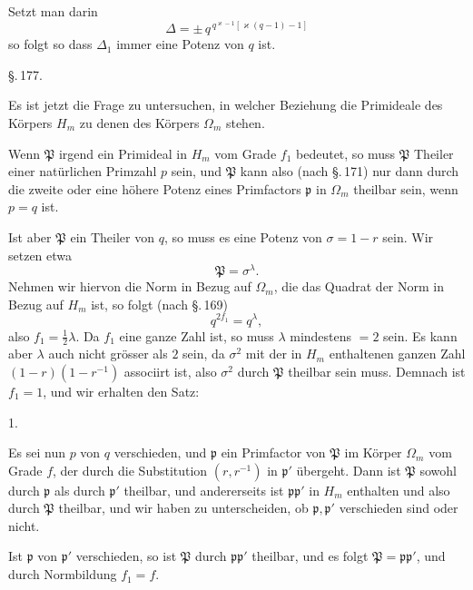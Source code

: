 Setzt man darin
\[
\Delta = \pm\,q^{\,q^{\varkappa-1}[\varkappa(q-1)-1]}
\]
so folgt
so dass $\Delta_1$ immer eine Potenz von $q$ ist.

\begin{center}
\S.\,177.\\[4pt]
\end{center}

Es ist jetzt die Frage zu untersuchen, in welcher Beziehung die Primideale des K\"orpers $H_m$ zu denen des K\"orpers $\Omega_m$ stehen.

Wenn $\mathfrak{P}$ irgend ein Primideal in $H_m$ vom Grade $f_1$ bedeutet, so muss $\mathfrak{P}$ Theiler einer nat\"urlichen Primzahl $p$ sein, und $\mathfrak{P}$ kann also (nach \S.\,171) nur dann durch die zweite oder eine h\"ohere Potenz eines Primfactors $\mathfrak{p}$ in $\Omega_m$ theilbar sein, wenn $p=q$ ist.

Ist aber $\mathfrak{P}$ ein Theiler von $q$, so muss es eine Potenz von $\sigma=1-r$ sein. Wir setzen etwa
\[
\mathfrak{P}=\sigma^\lambda.
\]
Nehmen wir hiervon die Norm in Bezug auf $\Omega_m$, die das Quadrat der Norm in Bezug auf $H_m$ ist, so folgt (nach \S.\,169)
\[
q^{2f_1}=q^\lambda,
\]
also $f_1=\frac12\lambda$. Da $f_1$ eine ganze Zahl ist, so muss $\lambda$ mindestens $=2$ sein. Es kann aber $\lambda$ auch nicht gr\"osser als $2$ sein, da $\sigma^2$ mit der in $H_m$ enthaltenen ganzen Zahl $(1-r)(1-r^{-1})$ associirt ist, also $\sigma^2$ durch $\mathfrak{P}$ theilbar sein muss. Demnach ist $f_1=1$, und wir erhalten den Satz:

1. 

Es sei nun $p$ von $q$ verschieden, und $\mathfrak{p}$ ein Primfactor von $\mathfrak{P}$ im K\"orper $\Omega_m$ vom Grade $f$, der durch die Substitution $(r,r^{-1})$ in $\mathfrak{p}'$ \"ubergeht. Dann ist $\mathfrak{P}$ sowohl durch $\mathfrak{p}$ als durch $\mathfrak{p}'$ theilbar, und andererseits ist $\mathfrak{p}\mathfrak{p}'$ in $H_m$ enthalten und also durch $\mathfrak{P}$ theilbar, und wir haben zu unterscheiden, ob $\mathfrak{p}, \mathfrak{p}'$ verschieden sind oder nicht.

Ist $\mathfrak{p}$ von $\mathfrak{p}'$ verschieden, so ist $\mathfrak{P}$ durch $\mathfrak{p}\mathfrak{p}'$ theilbar, und es folgt $\mathfrak{P}=\mathfrak{p}\mathfrak{p}'$, und durch Normbildung $f_1=f$.
